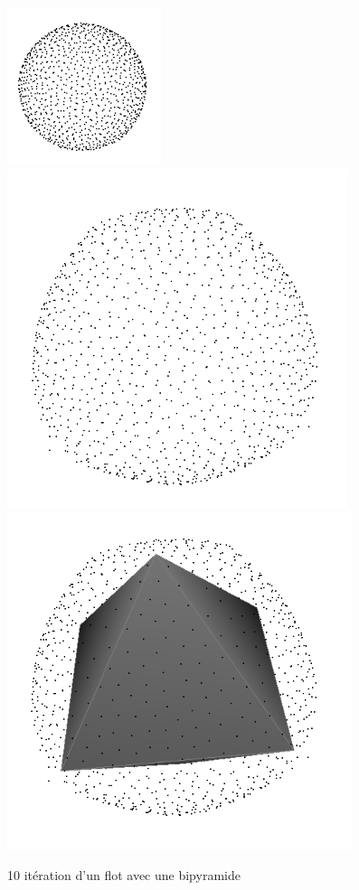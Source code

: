 \documentclass{beamer}
\begin{document}
\begin{frame}[allowframebreaks]
    \begin{figure}
        \centering
        \includegraphics[scale=0.4]{img/sphere-cube-0}
        \includegraphics[scale=0.2]{img/sphere-bipyramid-10}
        \includegraphics[scale=0.2]{img/sphere-bipyramid-bipyramid}
        \caption{10 itération d'un flot avec une bipyramide}
    \end{figure}
\end{frame}
\end{document}
